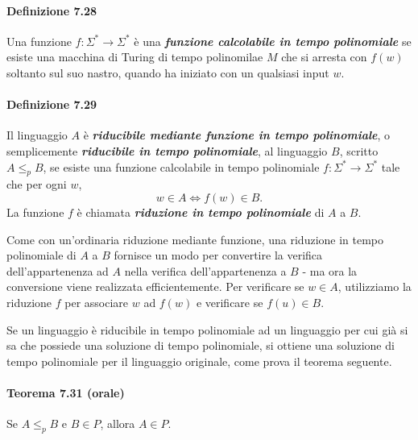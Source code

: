 \documentclass{article}
\begin{document}
\paragraph{Definizione 7.28}
\label{definizione-7.28}
\vspace{1em}
\text{}
\newline
\begin{tcolorbox}[colback=yellow!10!white, colframe=yellow!50!black, title=Definizione 7.28]
    Una funzione $f: \Sigma^* \rightarrow \Sigma^*$ è una \textit{\textbf{funzione calcolabile in tempo polinomiale}} se esiste una macchina di Turing di tempo polinomilae $M$ che si arresta con $f(w)$ soltanto sul suo nastro, quando ha iniziato con un qualsiasi input $w$.
\end{tcolorbox}

\paragraph{Definizione 7.29}
\label{definizione-7.29}
\vspace{1em}
\text{}
\newline
\begin{tcolorbox}[colback=yellow!10!white, colframe=yellow!50!black, title=Definizione 7.29]
    Il linguaggio $A$ è \textit{\textbf{riducibile mediante funzione in tempo polinomiale}}, o semplicemente \textit{\textbf{riducibile in tempo polinomiale}}, al linguaggio $B$, scritto $A \leq_p B$, se esiste una funzione calcolabile in tempo polinomiale $f: \Sigma^* \rightarrow \Sigma^*$ tale che per ogni $w$,
    $$
    w \in A \iff f(w) \in B.
    $$
    La funzione $f$ è chiamata \textit{\textbf{riduzione in tempo polinomiale}} di $A$ a $B$.
\end{tcolorbox}

Come con un'ordinaria riduzione mediante funzione, una riduzione in tempo polinomiale di $A$ a $B$ fornisce un modo per convertire la verifica dell'appartenenza ad $A$ nella verifica dell'appartenenza a $B$ - ma ora la conversione viene realizzata efficientemente.
Per verificare se $w \in A$, utilizziamo la
riduzione $f$ per associare $w$ ad $f(w)$ e verificare se $f(u) \in B$.

Se un linguaggio è riducibile in tempo polinomiale ad un linguaggio per cui già si sa che possiede una soluzione di tempo polinomiale, si ottiene una soluzione di tempo polinomiale per il linguaggio originale, come prova il teorema seguente.
\paragraph{Teorema 7.31 (orale)}
\label{teorema-7.31}
\vspace{1em}
\text{}
\newline
Se $A \leq_p B$ e $B \in P$, allora $A \in P$.
\end{document}
